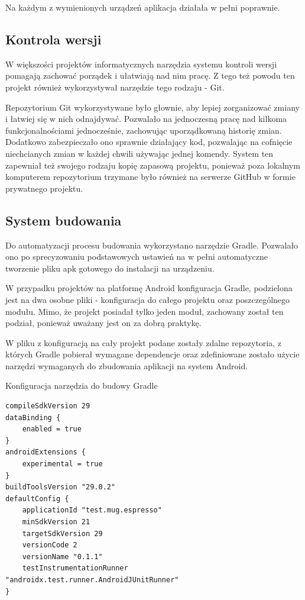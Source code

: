 \documentclass[polish,polish,a4paper,12pt]{article}
\begin{document}
	Na każdym z wymienionych urządzeń aplikacja działała w pełni poprawnie.

	\subsection{Kontrola wersji}

	W większości projektów informatycznych narzędzia systemu kontroli wersji pomagają zachować porządek i ułatwiają nad nim pracę. Z tego też powodu ten projekt również wykorzystywał narzędzie tego rodzaju - Git.

	Repozytorium Git wykorzystywane było głownie, aby lepiej zorganizować zmiany i łatwiej się w nich odnajdywać. Pozwalało na jednoczesną pracę nad kilkoma funkcjonalnościami jednocześnie, zachowując uporządkowaną historię zmian. Dodatkowo zabezpieczało ono sprawnie działający kod, pozwalając na cofnięcie niechcianych zmian w każdej chwili używając jednej komendy. System ten zapewniał też swojego rodzaju kopię zapasową projektu, ponieważ poza lokalnym komputerem repozytorium trzymane było również na serwerze GitHub w formie prywatnego projektu.

	\subsection{System budowania}

	Do automatyzacji procesu budowania wykorzystano narzędzie Gradle. Pozwalało ono po sprecyzowaniu podstawowych ustawień na w pełni automatyczne tworzenie pliku apk gotowego do instalacji na urządzeniu.

	W przypadku projektów na platformę Android konfiguracja Gradle, podzielona jest na dwa osobne pliki - konfiguracja do całego projektu oraz poszczególnego modułu. Mimo, że projekt posiadał tylko jeden moduł, zachowany został ten podział, ponieważ uważany jest on za dobrą praktykę.

	W pliku z konfiguracją na cały projekt podane zostały zdalne repozytoria, z których Gradle pobierał wymagane dependencje oraz zdefiniowane zostało użycie narzędzi wymaganych do zbudowania aplikacji na system Android.

	\begin{listing}[H]
		\caption{Konfiguracja narzędzia do budowy Gradle}
		\begin{verbatim}
compileSdkVersion 29
dataBinding {
	enabled = true
}
androidExtensions {
	experimental = true
}
buildToolsVersion "29.0.2"
defaultConfig {
	applicationId "test.mug.espresso"
	minSdkVersion 21
	targetSdkVersion 29
	versionCode 2
	versionName "0.1.1"
	testInstrumentationRunner "androidx.test.runner.AndroidJUnitRunner"
}
		\end{verbatim}
		\label{listing:gradle}
	\end{listing}
\end{document}
